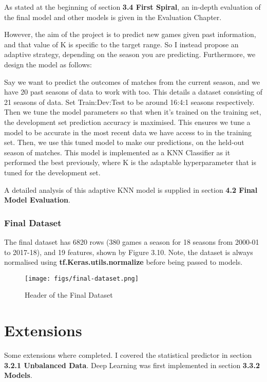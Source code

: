 \documentclass[12pt,a4paper,twoside,openright]{report}
\begin{document}
As stated at the beginning of section \textbf{3.4 First Spiral}, an in-depth evaluation of the final model and other models is given in the Evaluation Chapter.

However, the aim of the project is to predict new games given past information, and that value of K is specific to the target range. So I instead propose an adaptive strategy, depending on the season you are predicting. Furthermore, we design the model as follows:

Say we want to predict the outcomes of matches from the current season, and we have 20 past seasons of data to work with too. This details a dataset consisting of 21 seasons of data. Set Train:Dev:Test to be around 16:4:1 seasons respectively. Then we tune the model parameters so that when it's trained on the training set, the development set prediction accuracy is maximised. This ensures we tune a model to be accurate in the most recent data we have access to in the training set. Then, we use this tuned model to make our predictions, on the held-out season of matches. This model is implemented as a KNN Classifier as it performed the best previously, where K is the adaptable hyperparameter that is tuned for the development set.

A detailed analysis of this adaptive KNN model is supplied in section \textbf{4.2 Final Model Evaluation}.

\subsubsection{Final Dataset}

The final dataset has 6820 rows (380 games a season for 18 seasons from 2000-01 to 2017-18), and 19 features, shown by Figure 3.10. Note, the dataset is always normalised using \textbf{tf.Keras.utils.normalize} before being passed to models.

\begin{figure}[h]
  \centering
  \texttt{[image: figs/final-dataset.png]}
  \caption{Header of the Final Dataset}
  \label{fig:final-dataset}
\end{figure}

\section{Extensions}

Some extensions where completed. I covered the statistical predictor in section \textbf{3.2.1 Unbalanced Data}. Deep Learning was first implemented in section \textbf{3.3.2 Models}.
\end{document}

